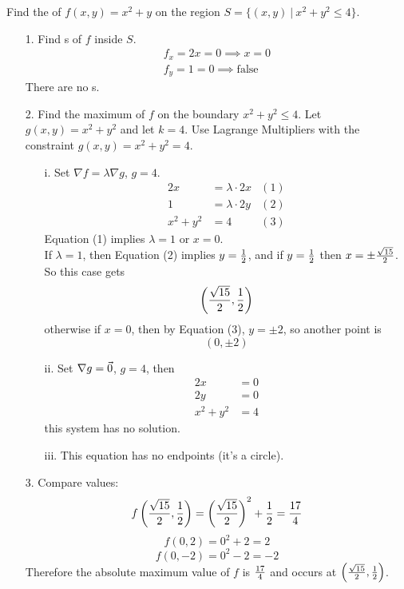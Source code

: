 \documentclass[english, 11pt]{article}
\begin{document}
\begin{exmp}Find the  of $f(x,y) = x^2 + y$ on the region $S = \{(x,y) \ | \ x^2 + y^2 \leq 4\}$. \\

\begin{itemize}
  \item[1.] Find s of $f$ inside $S$.
  \begin{align*}
    f_x = 2x = 0 \implies x = 0 \\
    f_y = 1 = 0 \implies \mbox{false}
  \end{align*}
  There are no s.
  \item[2.] Find the maximum of $f$ on the boundary $x^2 + y^2 \leq 4$. Let $g(x,y) = x^2 + y^2$ and let $k = 4$. Use Lagrange Multipliers with the constraint $g(x,y) = x^2 + y^2 = 4$.
  \begin{itemize}
    \item[i.] Set $\nabla f = \lambda \nabla g$, $g = 4$.
    \begin{align*}
      2x & = \lambda \cdot 2x & (1) \\
      1 & = \lambda \cdot 2y & (2) \\
      x^2 + y^2 & = 4 & (3)
    \end{align*}
    Equation (1) implies $\lambda = 1$ or $x = 0$. \\
    If $\lambda = 1$, then Equation (2) implies $y = \frac{1}{2}$, and if $y = \frac{1}{2}$ then $x = \pm \frac{\sqrt{15}}{2}$. So this case gets
    \[ \left( \frac{\sqrt{15}}{2}, \frac{1}{2} \right) \]
    otherwise if $x = 0$, then by Equation (3), $y = \pm 2$, so another point is
    \[ (0,\pm 2) \]
    \item[ii.] Set $\nabla g = \vec{0}$, $g = 4$, then
    \begin{align*}
      2x & = 0 \\
      2y & = 0 \\
      x^2 + y^2 & = 4
    \end{align*}
    this system has no solution.
    \item[iii.] This equation has no endpoints (it's a circle).
  \end{itemize}
  \item[3.] Compare values:
  \[ f \left( \frac{\sqrt{15}}{2}, \frac{1}{2}  \right) = \left( \frac{\sqrt{15}}{2} \right)^2 + \frac{1}{2} = \frac{17}{4} \]
  \[ f(0,2) = 0^2 + 2 = 2 \]
  \[ f(0,-2) = 0^2 -2 = -2 \]
  Therefore the absolute maximum value of $f$ is $\frac{17}{4}$ and occurs at $ \left( \frac{\sqrt{15}}{2}, \frac{1}{2}  \right) $.
\end{itemize}
\end{exmp}
\end{document}
